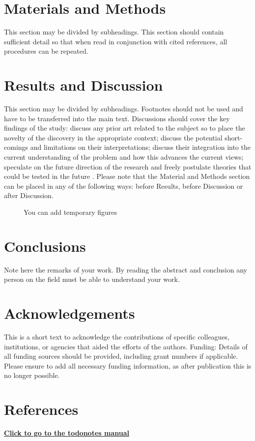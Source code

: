 \documentclass[10pt, a4paper, twocolumn]{article}
\begin{document}
\section{Materials and Methods}
This section may be divided by subheadings. This section should contain sufficient detail so that when read in conjunction with cited references, all procedures can be repeated.

\section{Results and Discussion}
This section may be divided by subheadings. Footnotes should not be used and have to be transferred into the main text.
Discussions should cover the key findings of the study: discuss any prior art related to the subject so to place the novelty of the discovery in the appropriate context; discuss the potential short-comings and limitations on their interpretations; discuss their integration into the current understanding of the problem and how this advances the current views; speculate on the future direction of the research and freely postulate theories that could be tested in the future \cite{cengel, coleparmer, goulds}.
Please note that the Material and Methods section can be placed in any of the following ways: before Results, before Discussion or after Discussion.

\begin{figure}[htbp!]
	\centering
	\caption{You can add temporary figures}
	\label{fig:placeholder}
\end{figure}

\section{Conclusions}
Note here the remarks of your work. By reading the abstract and conclusion any person on the field must be able to understand your work.

\section*{Acknowledgements}
This is a short text to acknowledge the contributions of specific colleagues, institutions, or agencies that aided the efforts of the authors. 
Funding: Details of all funding sources should be provided, including grant numbers if applicable. Please ensure to add all necessary funding information, as after publication this is no longer possible.

\section*{References}
\printbibliography[heading=none]


\listoftodos
\href{http://tug.ctan.org/macros/latex/contrib/todonotes/todonotes.pdf}
{\textbf{Click to go to the todonotes manual}}
\end{document}
